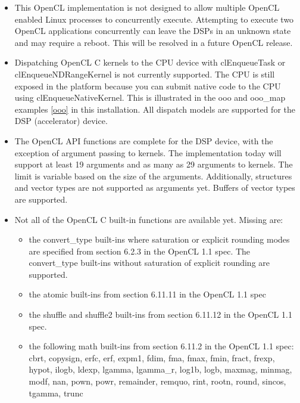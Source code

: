 \documentclass[10pt]{article}
\begin{document}
\begin{itemize}
\item This OpenCL implementation is not designed to allow multiple OpenCL enabled Linux processes 
to concurrently execute.  Attempting to execute two OpenCL applications
concurrently can leave the DSPs in an unknown state and may require a reboot.
This will be resolved in a future OpenCL release.

\item Dispatching OpenCL C kernels to the CPU device with clEnqueueTask or
clEnqueueNDRangeKernel is not currently supported.  The CPU is still exposed
in the platform because you can submit native code to the CPU using
clEnqueueNativeKernel.  This is illustrated in the ooo and ooo\_map examples \ref{ooo} in
this installation.  All dispatch models are supported for the DSP (accelerator) device.

\item The OpenCL API functions are complete for the DSP device, with the exception of
argument passing to kernels.  The implementation today will support at least
19 arguments and as many as 29 arguments to kernels.  The limit is variable
based on the size of the arguments.  Additionally, structures and vector types are
not supported as arguments yet.  Buffers of vector types are supported.

\item Not all of the OpenCL C built-in functions are available yet. Missing are:

\begin{itemize}
        \item the convert\_type built-ins where saturation or explicit rounding
        modes are specified from section 6.2.3 in the OpenCL 1.1 spec.  The 
        convert\_type built-ins without saturation of explicit rounding are supported.
        \item the atomic built-ins from section 6.11.11 in the OpenCL 1.1 spec
        \item the shuffle and shuffle2 built-ins from section 6.11.12 in the OpenCL 1.1 spec.
        \item the following math built-ins from section 6.11.2 in the OpenCL 1.1 spec:
        cbrt, copysign, erfc, erf, expm1, fdim, fma, fmax, fmin, fract, frexp,
        hypot, ilogb, ldexp, lgamma, lgamma\_r, log1b, logb, maxmag, minmag,
        modf, nan, pown, powr, remainder, remquo, rint, rootn, round,
        sincos, tgamma, trunc
\end{itemize}


\end{itemize}
\end{document}
